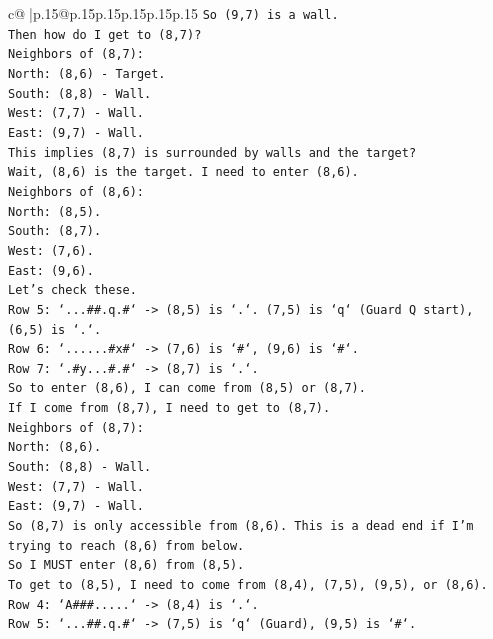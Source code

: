 \documentclass{article}
\begin{document}
{\begin{supertabular}{c@{$\;$}|p{.15\linewidth}@{}p{.15\linewidth}p{.15\linewidth}p{.15\linewidth}p{.15\linewidth}p{.15\linewidth}}
{{{\texttt{So (9,7) is a wall.} \\
\texttt{Then how do I get to (8,7)?} \\
\texttt{Neighbors of (8,7):} \\
\texttt{North: (8,6) {-} Target.} \\
\texttt{South: (8,8) {-} Wall.} \\
\texttt{West: (7,7) {-} Wall.} \\
\texttt{East: (9,7) {-} Wall.} \\
\texttt{This implies (8,7) is surrounded by walls and the target?} \\
\texttt{Wait, (8,6) is the target. I need to enter (8,6).} \\
\texttt{Neighbors of (8,6):} \\
\texttt{North: (8,5).} \\
\texttt{South: (8,7).} \\
\texttt{West: (7,6).} \\
\texttt{East: (9,6).} \\
\texttt{Let's check these.} \\
\texttt{Row 5: `...\#\#.q.\#` {-}> (8,5) is `.`. (7,5) is `q` (Guard Q start), (6,5) is `.`.} \\
\texttt{Row 6: `......\#x\#` {-}> (7,6) is `\#`, (9,6) is `\#`.} \\
\texttt{Row 7: `.\#y...\#.\#` {-}> (8,7) is `.`.} \\
\texttt{So to enter (8,6), I can come from (8,5) or (8,7).} \\
\texttt{If I come from (8,7), I need to get to (8,7).} \\
\texttt{Neighbors of (8,7):} \\
\texttt{North: (8,6).} \\
\texttt{South: (8,8) {-} Wall.} \\
\texttt{West: (7,7) {-} Wall.} \\
\texttt{East: (9,7) {-} Wall.} \\
\texttt{So (8,7) is only accessible from (8,6). This is a dead end if I'm trying to reach (8,6) from below.} \\
\texttt{So I MUST enter (8,6) from (8,5).} \\
\texttt{To get to (8,5), I need to come from (8,4), (7,5), (9,5), or (8,6).} \\
\texttt{Row 4: `A\#\#\#.....` {-}> (8,4) is `.`.} \\
\texttt{Row 5: `...\#\#.q.\#` {-}> (7,5) is `q` (Guard), (9,5) is `\#`.} \\
}}}
\end{supertabular}}
\end{document}
